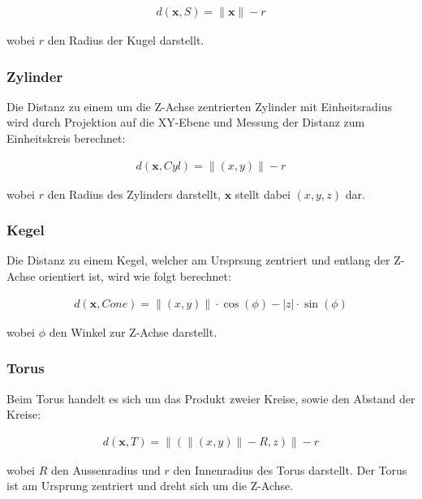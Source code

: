 \begin{gather}
    d(\bm{x}, S) = \|\bm{x}\| - r
\end{gather}

wobei $r$ den Radius der Kugel darstellt.

\subsubsection{Zylinder}
\label{ssubsec:implicit_surfaces_primitives_cylinder}

Die Distanz zu einem um die Z-Achse zentrierten Zylinder mit Einheitsradius wird durch Projektion auf die XY-Ebene und Messung der Distanz zum Einheitskreis berechnet:

\begin{gather}
    d(\bm{x}, Cyl) = \|(x, y)\| - r
\end{gather}

wobei $r$ den Radius des Zylinders darstellt, $\bm{x}$ stellt dabei $(x,y,z)$ dar.

\subsubsection{Kegel}
\label{ssubsec:implicit_surfaces_primitives_cone}

Die Distanz zu einem Kegel, welcher am Ursprsung zentriert und entlang der Z-Achse orientiert ist, wird wie folgt berechnet:

\begin{gather}
    d(\bm{x}, Cone) = \|(x, y)\| \cdot \cos(\phi) - |z| \cdot \sin(\phi)
\end{gather}

wobei $\phi$ den Winkel zur Z-Achse darstellt.

\subsubsection{Torus}
\label{ssubsec:implicit_surfaces_primitives_torus}

Beim Torus handelt es sich um das Produkt zweier Kreise, sowie den Abstand der Kreise:

\begin{gather}
    d(\bm{x}, T) = \|(\|(x, y)\| - R, z)\| - r
\end{gather}

wobei $R$ den Aussenradius und $r$ den Innenradius des Torus darstellt. Der Torus ist am Ursprung zentriert und dreht sich um die Z-Achse.
